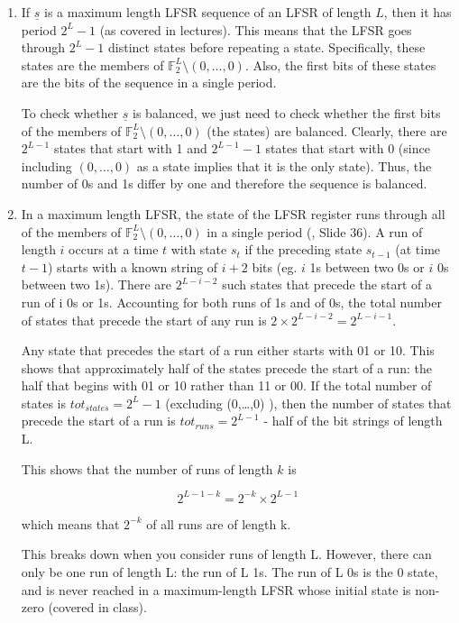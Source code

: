 \begin{enumerate}

\item If $\underline{s}$ is a maximum length LFSR sequence of an LFSR of length
$L$, then it has period $2^L-1$ (as covered in lectures). This means that the
LFSR goes through $2^L-1$ distinct states before repeating a state.
Specifically, these states are the members of $\mathbb{F}_2^L \setminus
(0,\dots,0)$. Also, the first bits of these states are the bits of the sequence
in a single period.

To check whether $\underline{s}$ is balanced, we just need to check whether the
first bits of the members of $\mathbb{F}_2^L \setminus (0,\dots,0)$ (the states)
are balanced. Clearly, there are $2^{L-1}$ states that start with 1 and
$2^{L-1}-1$ states that start with 0 (since including $(0,\dots,0)$ as a state
implies that it is the only state). Thus, the number of 0s and 1s differ by one
and therefore the sequence is balanced.

\item In a maximum length LFSR, the state of the LFSR register runs through all
of the members of $\mathbb{F}_2^L \setminus (0,\dots,0)$ in a single period
(\cite{slides}, Slide 36). A run of length $i$ occurs at a time $t$ with state
$s_t$ if the preceding state $s_{t-1}$ (at time $t-1$) starts with a known
string of $i+2$ bits (eg. $i$ 1s between two 0s or $i$ 0s between two 1s). There
are $2^{L-i-2}$ such states that precede the start of a run of i 0s or 1s.
Accounting for both runs of 1s and of 0s, the total number of states that
precede the start of any run is $2 \times 2^{L-i-2} = 2^{L-i-1}$.

Any state that precedes the start of a run either starts with 01 or 10. This
shows that approximately half of the states precede the start of a run: the half
that begins with 01 or 10 rather than 11 or 00. If the total number of states is
$tot_{states} = 2^L-1$ (excluding (0,\dots,0) ), then the number of states that
precede the start of a run is $tot_{runs} = 2^{L-1}$ - half of the bit strings
of length L.

This shows that the number of runs of length $k$ is

\[2^{L-1-k} = 2^{-k} \times 2^{L-1}\]

which means that $2^{-k}$ of all runs are of length k.

This breaks down when you consider runs of length L. However, there can only be
one run of length L: the run of L 1s. The run of L 0s is the 0 state, and is
never reached in a maximum-length LFSR whose initial state is non-zero (covered
in class).

\end{enumerate}
